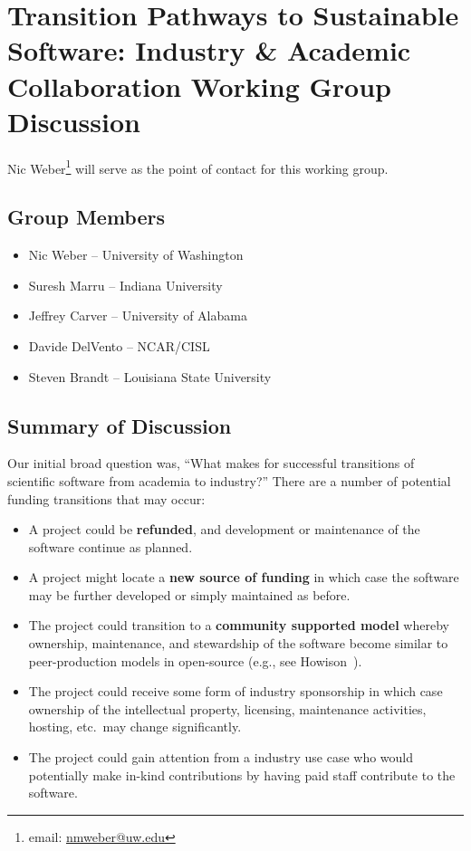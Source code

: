 \section{Transition Pathways to Sustainable Software: Industry \& Academic Collaboration Working Group Discussion}
\label{sec:appendix_industry_interaction}

Nic Weber\footnote{email: \href{mailto:nmweber@uw.edu}{nmweber@uw.edu}} will serve as the point of contact for this working group.

\subsection{Group Members}

\begin{itemize}
\item Nic Weber -- University of Washington
\item Suresh Marru -- Indiana University
\item Jeffrey Carver -- University of Alabama
\item Davide DelVento -- NCAR/CISL
\item Steven Brandt -- Louisiana State University
\end{itemize} 

\subsection{Summary of Discussion}

Our initial broad question was, ``What makes for successful transitions of scientific software from academia to industry?'' There are a number of potential funding transitions that may occur:  
%
\begin{itemize}

\item A project could be \textbf{refunded}, and development or maintenance of
the software continue as planned.

\item A project might locate a \textbf{new source of funding} in which case the
software may be further developed or simply maintained as before.

\item The project could transition to a \textbf{community supported model}
whereby ownership, maintenance, and stewardship of the software become similar
to peer-production models in open-source (e.g., see Howison~\cite{howison_sustaining_2015}).

\item The project could receive some form of industry sponsorship in which case
ownership of the intellectual property, licensing, maintenance activities,
hosting, etc.\ may change significantly.

\item The project could gain attention from a industry use case who would potentially make in-kind
contributions by having paid staff contribute to the software.

\end{itemize}

